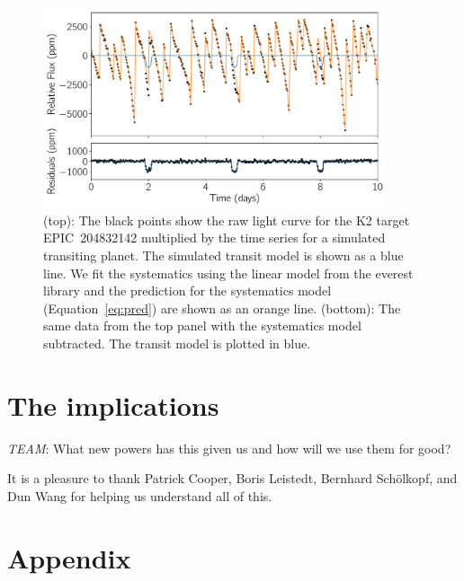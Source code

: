 \documentclass[modern]{rnaastex}
\newcommand{\project}[1]{\textsf{#1}}
\newcommand{\figurelabel}[1]{\label{fig:#1}}
\renewcommand{\eqref}[1]{\ref{eq:#1}}
\newcommand{\eqalt}[1]{Equation~\eqref{#1}}
\newcommand{\todo}[3]{{\color{#2}\emph{#1}: #3}}
\newcommand{\alltodo}[1]{\todo{TEAM}{red}{#1}}
\begin{document}
\begin{figure}[h!]
\begin{center}
\includegraphics[width=0.9\textwidth]{figure.pdf}
\caption{%
(top): The black points show the raw light curve for the \project{K2} target
    EPIC~204832142 multiplied by the time series for a simulated transiting
    planet.
    The simulated transit model is shown as a blue line.
    We fit the systematics using the linear model from the \project{everest}
    library \citep{Luger:2016, Luger:2017} and the prediction for the
    systematics model (\eqalt{pred}) are shown as an orange line.
(bottom): The same data from the top panel with the systematics model
    subtracted.
    The transit model is plotted in blue.
\figurelabel{figure}}
\end{center}
\end{figure}

\section{The implications}

\alltodo{What new powers has this given us and how will we use them for good?}

\acknowledgements
It is a pleasure to thank
  Patrick Cooper,
  Boris Leistedt,
  Bernhard Sch\"olkopf, and
  Dun Wang
for helping us understand all of this.



\section{Appendix}
\end{document}
